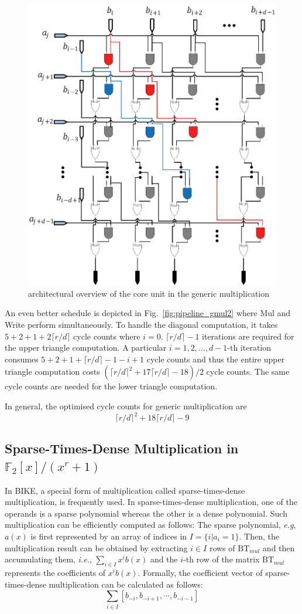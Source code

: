 \documentclass[preprint]{iacrtrans}
\begin{document}
\begin{figure}[!tb]
\centering
\includegraphics[width=.55\textwidth]{./fig/dsnmul_core.eps}
\caption{architectural overview of the core unit in the generic multiplication}\label{fig:gmul_core}
\end{figure}

An even better schedule is depicted in Fig.~\ref{fig:pipeline_gmul2} where Mul and Write perform simultaneously.
To handle the diagonal computation, it takes $5+2+1+2\lceil r/d\rceil$ cycle counts where $i=0$. $\lceil r/d\rceil -1$ iterations are required for the upper triangle computation. A particular $i=1,2,\ldots,d-1$-th iteration consumes $5+2+1+\lceil r/d\rceil -1-i+1$ cycle counts and thus the entire upper triangle computation costs $(\lceil r/d\rceil^2 +17\lceil r/d\rceil-18)/2$ cycle counts. The same cycle counts are needed for the lower triangle computation.

In general, the optimised cycle counts for generic multiplication are
\[
    \lceil r/d\rceil^2 + 18\lceil r/d\rceil - 9
\]

\subsection{Sparse-Times-Dense Multiplication in $\mathbb{F}_2[x]/(x^r+1)$}
In BIKE, a special form of multiplication called sparse-times-dense multiplication, is frequently used. In sparse-times-dense multiplication, one of the operands is a sparse polynomial whereas the other is a dense polynomial. Such multiplication can be efficiently computed as follows: The sparse polynomial, \textit{e.g}, $a(x)$ is first represented by an array of indices in $I=\{i|a_i=1\}$. Then, the multiplication result can be obtained by extracting $i\in I$ rows of $\text{BT}_{mul}$ and then accumulating them, \textit{i.e.}, $\sum_{i\in I} x^ib(x)$ and the $i$-th row of the matrix $\text{BT}_{mul}$ represents the coefficients of $x^ib(x)$. Formally, the coefficient vector of sparse-times-dense multiplication can be calculated as follows:
\[
    \sum_{i\in I} [b_{-i},b_{-i+1},\cdots,b_{-i-1}]
\]
\end{document}
